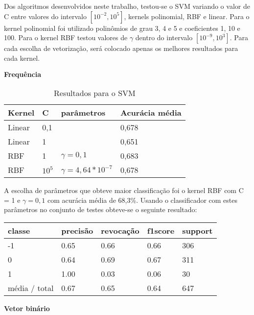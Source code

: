Dos algoritmos desenvolvidos neste trabalho, testou-se o SVM variando o valor de C entre valores
do intervalo $[10^{-2}, 10^5]$, kernels polinomial, RBF e linear. Para o kernel polinomial foi utilizado
polinômios de grau 3, 4 e 5 e coeficientes 1, 10 e 100. Para o kernel RBF testou valores de $\gamma$
dentro do intervalo $[10^{-9}, 10^3]$. Para cada escolha de vetorização, será colocado apenas os
melhores resultados para cada kernel.

\textbf{Frequência}

\begin{table}[H]
	\centering
	\caption{Resultados para o SVM}
	\begin{tabular}{l l l l}
		\hline
		Kernel & C & parâmetros & Acurácia média \\
		\hline
		Linear & 0,1 & & 0,678 \\
		\hline
		Linear & 1 & & 0,651 \\
		\hline
		RBF & 1 & $\gamma = 0,1$ & 0,683 \\
		\hline
		RBF & $10^5$ & $\gamma = 4,64*10^{-7}$ & 0,678 \\
		\hline
	\end{tabular}
\end{table}

A escolha de parâmetros que obteve maior classificação foi o kernel RBF com C = 1 e $\gamma = 0,1$
com acurácia média de 68,3\%. Usando o classificador com estes parâmetros no conjunto de testes
obteve-se o seguinte resultado:

\begin{table}[H]
	\centering
	\begin{tabular}{l | l | l | l | l}
		\hline
		classe  	&	precisão  &  revocação &  f1\-score &  support \\
		\hline
         -1   &    0.65  &    0.66   &   0.66   &    306 \\
         \hline
          0   &    0.64   &   0.69   &   0.67    &   311 \\
          \hline
          1   &    1.00   &   0.03   &   0.06    &    30 \\
		\hline
		média / total   &    0.67   &   0.65   &   0.64   &    647 \\
		\hline
	\end{tabular}
\end{table}

\textbf{Vetor binário}

